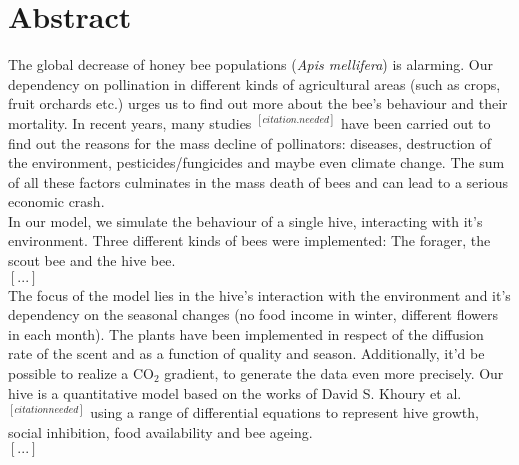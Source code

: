 \section{Abstract}
The global decrease of honey bee populations (\textit{Apis mellifera}) is alarming. Our dependency on pollination in different kinds of agricultural areas (such as crops, fruit orchards etc.) urges us to find out more about the bee's behaviour and their mortality. In recent years, many studies $^{[citation.needed]}$ have been carried out to find out the reasons for the mass decline of pollinators: diseases, destruction of the environment, pesticides/fungicides and maybe even climate change. The sum of all these factors culminates in the mass death of bees and can lead to a serious economic crash.\\
In our model, we simulate the behaviour of a single hive, interacting with it's environment. Three different kinds of bees were implemented: The forager, the scout bee and the hive bee. \\
$[...]$\\
The focus of the model lies in the hive's interaction with the environment and it's dependency on the seasonal changes (no food income in winter, different flowers in each month). The plants have been implemented in respect of the diffusion rate of the scent and as a function of quality and season. Additionally, it'd be possible to realize a CO$_{2}$ gradient, to generate the data even more precisely. Our hive is a quantitative model based on the works of David S. Khoury et al. $^[citation needed]$ using a range of differential equations to represent hive growth, social inhibition, food availability and bee ageing.  
\\
$[...]$\\


